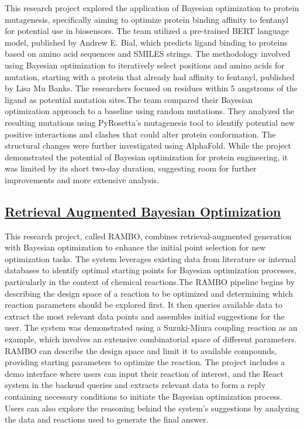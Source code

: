 This research project explored the application of Bayesian optimization to protein mutagenesis, specifically aiming to optimize protein binding affinity to fentanyl for potential use in biosensors. The team utilized a pre-trained BERT language model, published by Andrew E. Bial, which predicts ligand binding to proteins based on amino acid sequences and SMILES strings. The methodology involved using Bayesian optimization to iteratively select positions and amino acids for mutation, starting with a protein that already had affinity to fentanyl, published by Lisa Mu Banks. The researchers focused on residues within 5 angstroms of the ligand as potential mutation sites.The team compared their Bayesian optimization approach to a baseline using random mutations. They analyzed the resulting mutations using PyRosetta's mutagenesis tool to identify potential new positive interactions and clashes that could alter protein conformation. The structural changes were further investigated using AlphaFold. While the project demonstrated the potential of Bayesian optimization for protein engineering, it was limited by its short two-day duration, suggesting room for further improvements and more extensive analysis.
 \subsection*{\href{https://x.com/6ojaHa/status/1773734082637095155}{Retrieval Augmented Bayesian Optimization}}

This research project, called RAMBO, combines retrieval-augmented generation with Bayesian optimization to enhance the initial point selection for new optimization tasks. The system leverages existing data from literature or internal databases to identify optimal starting points for Bayesian optimization processes, particularly in the context of chemical reactions.The RAMBO pipeline begins by describing the design space of a reaction to be optimized and determining which reaction parameters should be explored first. It then queries available data to extract the most relevant data points and assembles initial suggestions for the user. The system was demonstrated using a Suzuki-Miura coupling reaction as an example, which involves an extensive combinatorial space of different parameters. RAMBO can describe the design space and limit it to available compounds, providing starting parameters to optimize the reaction. The project includes a demo interface where users can input their reaction of interest, and the React system in the backend queries and extracts relevant data to form a reply containing necessary conditions to initiate the Bayesian optimization process. Users can also explore the reasoning behind the system's suggestions by analyzing the data and reactions used to generate the final answer.
